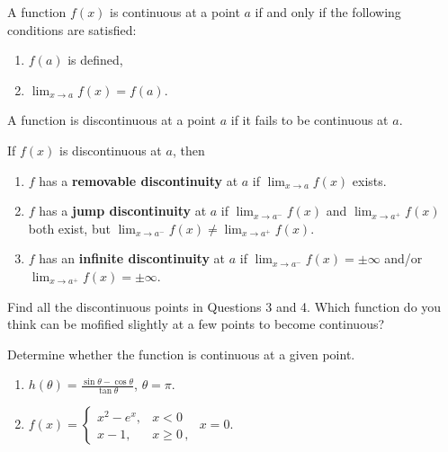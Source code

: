 \documentclass[12pt]{amsart}
\begin{document}
\begin{definition}
	A function $f(x)$ is continuous at a point $a$ if and only if the following conditions are satisfied:
	\begin{enumerate}
		\item $f(a)$ is defined,
		\item $\lim_{x\to a} f(x) = f(a)$.
	\end{enumerate}
	A function is discontinuous at a point $a$ if it fails to be continuous at $a$.
\end{definition}


\begin{definition}
	If \( f(x) \) is discontinuous at \( a \), then
	\begin{enumerate}
		\item \( f \) has a \textbf{removable discontinuity} at \( a \) if \( \lim_{x \to a} f(x) \) exists. 		\item \( f \) has a \textbf{jump discontinuity} at \( a \) if \( \lim_{x \to a^-} f(x) \) and \( \lim_{x \to a^+} f(x) \) both exist, but \( \lim_{x \to a^-} f(x) \neq \lim_{x \to a^+} f(x) \).
		\item \( f \) has an \textbf{infinite discontinuity} at \( a \) if \( \lim_{x \to a^-} f(x) = \pm \infty \) and/or \( \lim_{x \to a^+} f(x) = \pm \infty \).
	\end{enumerate}
\end{definition}


\begin{question}
	Find all the discontinuous points in Questions 3 and 4.
	Which function do you think can be mofified slightly at a few points
	to become continuous?
\end{question}


\begin{question}
	Determine whether the function is continuous at a given point.
	\begin{enumerate}
		\item $h(\theta) = \frac{\sin \theta - \cos \theta }{\tan \theta}$, $ \theta = \pi$.
		      \vspace{5cm}
		\item $f(x) = \begin{cases}
				      x^2 - e^x , & x< 0        \\
				      x - 1 ,     & x \geq 0\,,
			      \end{cases}$
		      $x = 0 $.
		      \vspace{5cm}
	\end{enumerate}
\end{question}
\end{document}
